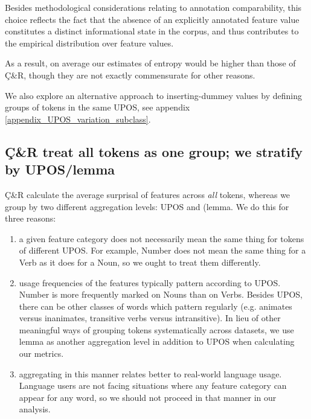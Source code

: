 \documentclass[USenglish]{article}
\begin{document}
Besides methodological considerations relating to annotation comparability, this choice reflects the fact that the absence of an explicitly annotated feature value constitutes a distinct informational state in the corpus, and thus contributes to the empirical distribution over feature values.




As a result, on average our estimates of entropy would be higher than those of Ç\&R, though they are not exactly commensurate for other reasons.

We also explore an alternative approach to inserting-dummey values by defining groups of tokens in the same UPOS, see appendix \ref{appendix_UPOS_variation_subclass}.


\subsection{Ç\&R treat all tokens as one group; we stratify by UPOS/lemma}\label{appedix:differences_aggregation_levels}

Ç\&R calculate the average surprisal of features across \emph{all} tokens, whereas we group by two different aggregation levels: UPOS and (lemma.
We do this for three reasons:
\begin{enumerate}
    \item a given feature category does not necessarily mean the same thing for tokens of different UPOS. For example, Number does not mean the same thing for a Verb as it does for a Noun, so we ought to treat them differently.
    \item usage frequencies of the features typically pattern according to UPOS. Number is more frequently marked on Nouns than on Verbs. Besides UPOS, there can be other classes of words which pattern regularly (e.g. animates versus inanimates, transitive verbs versus intransitive). In lieu of other meaningful ways of grouping tokens systematically across datasets, we use lemma as another aggregation level in addition to UPOS when calculating our metrics.
    \item aggregating in this manner relates better to real-world language usage. Language users are not facing situations where any feature category can appear for any word, so we should not proceed in that manner in our analysis.
\end{enumerate}
\end{document}
